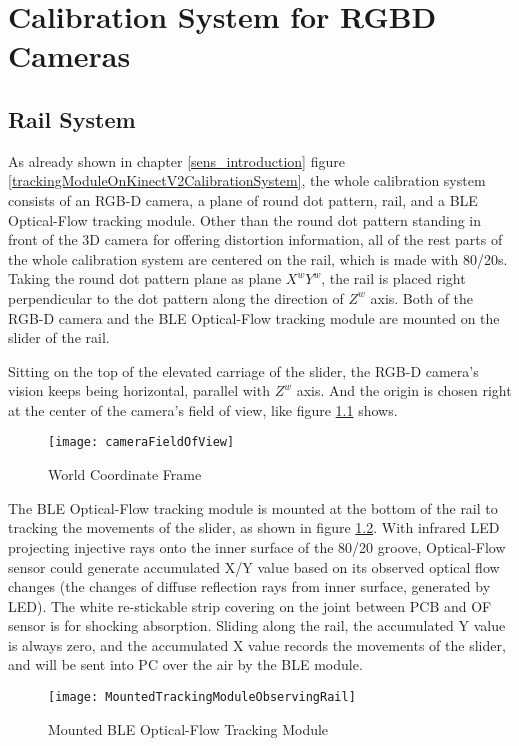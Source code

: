 \chapter{Calibration System for RGBD Cameras} %
\label{sens_CalibrationSystem} %
%
%
\section{Rail System}%
As already shown in chapter \ref{sens_introduction} figure \ref{trackingModuleOnKinectV2CalibrationSystem}, the whole calibration system consists of an RGB-D camera, a plane of round dot pattern, rail, and a BLE Optical-Flow tracking module. 
Other than the round dot pattern standing in front of the 3D camera for offering distortion information, all of the rest parts of the whole calibration system are centered on the rail, which is made with 80/20s. Taking the round dot pattern plane as plane \(X^wY^w\), the rail is placed right perpendicular to the dot pattern along the direction of \(Z^w\) axis. Both of the RGB-D camera and the BLE Optical-Flow tracking module are mounted on the slider of the rail. \par
%
Sitting on the top of the elevated carriage of the slider, the RGB-D camera's vision keeps being horizontal, parallel with \(Z^w\) axis. And the origin is chosen right at the center of the camera's field of view, like figure \ref{cameraFieldOfView} shows.\par
%
\begin{figure}[h]
\centering
\texttt{[image: cameraFieldOfView]}
\caption{World Coordinate Frame}
\label{cameraFieldOfView}
\end{figure}%
%
The BLE Optical-Flow tracking module is mounted at the bottom of the rail to tracking the movements of the slider, as shown in figure \ref{MountedTrackingModuleObservingRail}. With infrared LED projecting injective rays onto the inner surface of the 80/20 groove, Optical-Flow sensor could generate accumulated X/Y value based on its observed optical flow changes (the changes of diffuse reflection rays from inner surface, generated by LED). The white re-stickable strip covering on the joint between PCB and OF sensor is for shocking absorption. Sliding along the rail, the accumulated Y value is always zero, and the accumulated X value records the movements of the slider, and will be sent into PC over the air by the BLE module. 
%
\par
%
\begin{figure}[h]
\centering
\texttt{[image: MountedTrackingModuleObservingRail]}
\caption{Mounted BLE Optical-Flow Tracking Module}
\label{MountedTrackingModuleObservingRail}
\end{figure}%
%
%
